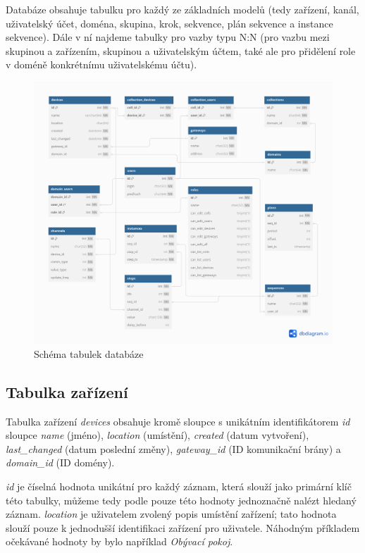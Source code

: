 Databáze obsahuje tabulku pro každý ze základních modelů (tedy zařízení, kanál, uživatelský účet, doména, skupina, krok, sekvence, plán sekvence a instance sekvence). Dále v ní najdeme tabulky pro vazby typu N:N (pro vazbu mezi skupinou a zařízením, skupinou a uživatelským účtem, také ale pro přidělení role v doméně konkrétnímu uživatelskému účtu).

\begin{figure}[h!]
    \centering
    \includegraphics[width=1\textwidth]{images/database.png}
    \caption[Schéma tabulek databáze]{Schéma tabulek databáze \cite[\nopp Figure 1]{database_schema_generator}}
    \label{fig:my_label}
\end{figure}

\subsection{Tabulka zařízení}
Tabulka zařízení \emph{devices} obsahuje kromě sloupce s unikátním identifikátorem \emph{id} sloupce \emph{name} (jméno), \emph{location} (umístění), \emph{created} (datum vytvoření), \emph{last\_changed} (datum poslední změny), \emph{gateway\_id} (ID komunikační brány) a \emph{domain\_id} (ID domény). 

\emph{id} je číselná hodnota unikátní pro každý záznam, která slouží jako primární klíč této tabulky, můžeme tedy podle pouze této hodnoty jednoznačně nalézt hledaný záznam. \emph{location} je uživatelem zvolený popis umístění zařízení; tato hodnota slouží pouze k jednodušší identifikaci zařízení pro uživatele. Náhodným příkladem očekávané hodnoty by bylo například \emph{Obývací pokoj}. 

